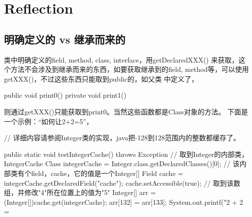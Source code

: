 \section[Reflection]{Reflection}

\subsection[明确定义的 vs 继承而来的]{明确定义的 vs 继承而来的}
类中明确定义的field, method, class, interface，用getDeclaredXXX()
来获取，这个方法不会涉及到继承而来的东西，如要获取继承到的field,
method等，可以使用getXXX()，不过这些东西只能取到public的，如父类
中定义了，

\begin{javacode}
public void print0() { }
private void print1() { }
\end{javacode}

则通过getXXX()只能获取到print0。当然这些函数都是Class对象的方法。
下面是一个示例：“如何让2+2=5”，

\begin{javacode}
// 详细内容请参阅Integer类的实现，java把-128到128范围内的整数都缓存了。

public static void testIntegerCache() throws Exception {
  // 取到Integer的内部类，IntegerCache
  Class integerCache = Integer.class.getDeclaredClasses()[0];
  // 该内部类有个field，cache，它的值是一个Integer[]
  Field cache = integerCache.getDeclaredField("cache");
  cache.setAccessible(true);
  // 取到该数组，并修改"4"所在位置上的值为"5"
  Integer[] arr = (Integer[])cache.get(integerCache);
  arr[132] = arr[133];
  System.out.printf("2 + 2 = %
}
\end{javacode}